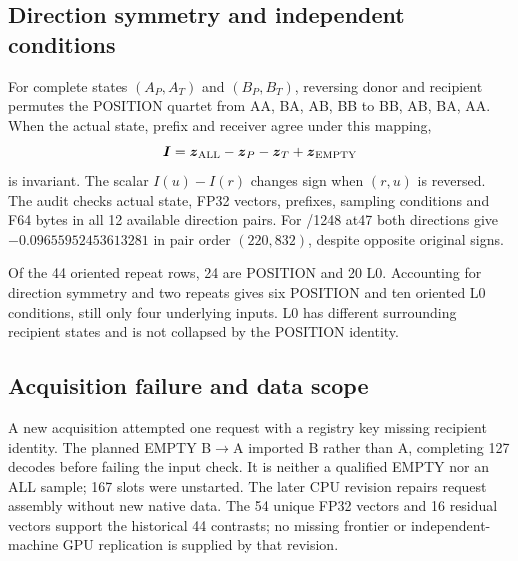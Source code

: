 \subsection{Direction symmetry and independent conditions}
For complete states $(A_P,A_T)$ and $(B_P,B_T)$, reversing donor and recipient permutes the POSITION quartet from AA, BA, AB, BB to BB, AB, BA, AA. When the actual state, prefix and receiver agree under this mapping,
\begin{equation}
\boldsymbol I=\boldsymbol z_{\rm ALL}-\boldsymbol z_P-\boldsymbol z_T+\boldsymbol z_{\rm EMPTY}
\end{equation}
is invariant. The scalar $I(u)-I(r)$ changes sign when $(r,u)$ is reversed. The audit checks actual state, FP32 vectors, prefixes, sampling conditions and F64 bytes in all 12 available direction pairs. For /1248 at47 both directions give $-0.09655952453613281$ in pair order $(220,832)$, despite opposite original signs.

Of the 44 oriented repeat rows, 24 are POSITION and 20 L0. Accounting for direction symmetry and two repeats gives six POSITION and ten oriented L0 conditions, still only four underlying inputs. L0 has different surrounding recipient states and is not collapsed by the POSITION identity.

\subsection{Acquisition failure and data scope}
A new acquisition attempted one request with a registry key missing recipient identity. The planned EMPTY B$\to$A imported B rather than A, completing 127 decodes before failing the input check. It is neither a qualified EMPTY nor an ALL sample; 167 slots were unstarted. The later CPU revision repairs request assembly without new native data. The 54 unique FP32 vectors and 16 residual vectors support the historical 44 contrasts; no missing frontier or independent-machine GPU replication is supplied by that revision.
